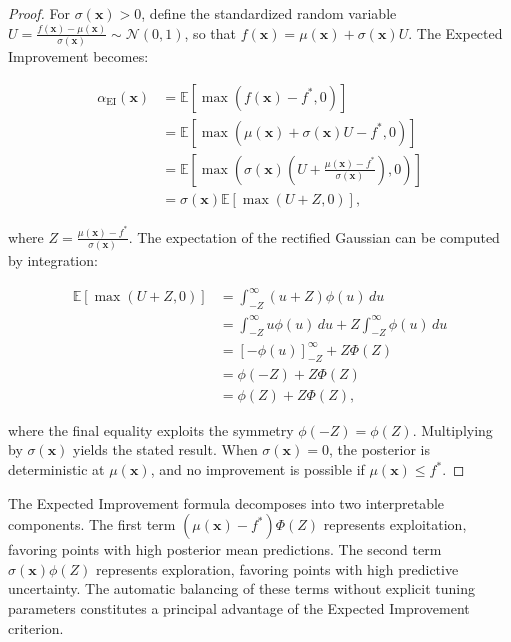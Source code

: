 \begin{proof}
For $\sigma(\mathbf{x}) > 0$, define the standardized random variable $U = \frac{f(\mathbf{x}) - \mu(\mathbf{x})}{\sigma(\mathbf{x})} \sim \mathcal{N}(0, 1)$, so that $f(\mathbf{x}) = \mu(\mathbf{x}) + \sigma(\mathbf{x}) U$. The Expected Improvement becomes:

\begin{align}
\alpha_{\text{EI}}(\mathbf{x}) &= \mathbb{E}\left[\max(f(\mathbf{x}) - f^*, 0)\right] \\
&= \mathbb{E}\left[\max(\mu(\mathbf{x}) + \sigma(\mathbf{x}) U - f^*, 0)\right] \\
&= \mathbb{E}\left[\max\left(\sigma(\mathbf{x})\left(U + \frac{\mu(\mathbf{x}) - f^*}{\sigma(\mathbf{x})}\right), 0\right)\right] \\
&= \sigma(\mathbf{x}) \mathbb{E}\left[\max(U + Z, 0)\right],
\end{align}

where $Z = \frac{\mu(\mathbf{x}) - f^*}{\sigma(\mathbf{x})}$. The expectation of the rectified Gaussian can be computed by integration:

\begin{align}
\mathbb{E}\left[\max(U + Z, 0)\right] &= \int_{-Z}^{\infty} (u + Z) \phi(u) \, du \\
&= \int_{-Z}^{\infty} u \phi(u) \, du + Z \int_{-Z}^{\infty} \phi(u) \, du \\
&= \left[-\phi(u)\right]_{-Z}^{\infty} + Z \Phi(Z) \\
&= \phi(-Z) + Z \Phi(Z) \\
&= \phi(Z) + Z \Phi(Z),
\end{align}

where the final equality exploits the symmetry $\phi(-Z) = \phi(Z)$. Multiplying by $\sigma(\mathbf{x})$ yields the stated result. When $\sigma(\mathbf{x}) = 0$, the posterior is deterministic at $\mu(\mathbf{x})$, and no improvement is possible if $\mu(\mathbf{x}) \leq f^*$.
\end{proof}

The Expected Improvement formula decomposes into two interpretable components. The first term $(\mu(\mathbf{x}) - f^*) \Phi(Z)$ represents exploitation, favoring points with high posterior mean predictions. The second term $\sigma(\mathbf{x}) \phi(Z)$ represents exploration, favoring points with high predictive uncertainty. The automatic balancing of these terms without explicit tuning parameters constitutes a principal advantage of the Expected Improvement criterion.

